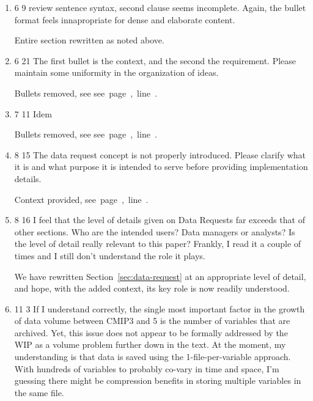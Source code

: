 \documentclass[gmd,manuscript]{copernicus}
\newcommand{\plref}[1]{\mbox{see page \pageref{p-#1}, line
    \lineref{l-#1}.}}
\newenvironment{answer}{\color{blue}}{}
\begin{document}
\begin{enumerate}[label=RC2-\arabic*,leftmargin=*]
  \begin{answer}
    We thank the reviewer for this useful guidance, and the entire
    Section~\ref{sec:infra-principles} has been rewritten as
    suggested, without bullets. Also, re ``changes'', \plref{RC2-14}
  \end{answer}
\item 6 9 review sentence syntax, second clause seems incomplete.
  Again, the bullet format feels innapropriate for dense and elaborate
  content.

  \begin{answer}
    Entire section rewritten as noted above.
  \end{answer}
\item 6 21 The first bullet is the context, and the second the
  requirement. Please maintain some uniformity in the organization of
  ideas.

  \begin{answer}
    Bullets removed, see \plref{RC2-16}
  \end{answer}
\item 7 11 Idem

  \begin{answer}
    Bullets removed, see \plref{RC2-17}
  \end{answer}
\item 8 15 The data request concept is not properly introduced. Please
  clarify what it is and what purpose it is intended to serve before
  providing implementation details.

  \begin{answer}
    Context provided, \plref{RC2-18}
  \end{answer}
\item 8 16 I feel that the level of details given on Data Requests far
  exceeds that of other sections. Who are the intended users? Data
  managers or analysts? Is the level of detail really relevant to this
  paper? Frankly, I read it a couple of times and I still don’t
  understand the role it plays.

  \begin{answer}
    We have rewritten Section~\ref{sec:data-request} at an appropriate
    level of detail, and hope, with the added context, its key role is
    now readily understood.
  \end{answer}
\item 11 3 If I understand correctly, the single most important factor
  in the growth of data volume between CMIP3 and 5 is the number of
  variables that are archived. Yet, this issue does not appear to be
  formally addressed by the WIP as a volume problem further down in
  the text. At the moment, my understanding is that data is saved
  using the 1-file-per-variable approach. With hundreds of variables
  to probably co-vary in time and space, I’m guessing there might be
  compression benefits in storing multiple variables in the same file.


\end{enumerate}
\end{document}
